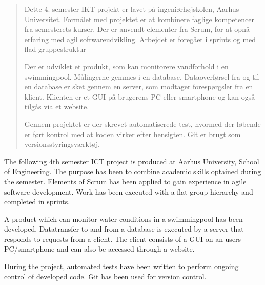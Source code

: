 \abstractintoc
\abstractcol
\setlength{\abstitleskip}{-18pt}


\begin{abstract}
Dette 4. semester IKT projekt er lavet på ingeniørhøjskolen, Aarhus Universitet. Formålet med projektet er at kombinere faglige kompetencer fra semesterets kurser. Der er anvendt elementer fra Scrum, for at opnå erfaring med agil softwareudvikling. Arbejdet er foregået i sprints og med flad gruppestruktur

Der er udviklet et produkt, som kan monitorere vandforhold i en swimmingpool. Målingerne gemmes i en database. Dataoverførsel fra og til en database er sket gennem en server, som modtager forespørgsler fra en klient. Klienten er et GUI på brugerens PC eller smartphone og kan også tilgås via et website.

Gennem projektet er der skrevet automatiserede test, hvormed der løbende er ført kontrol med at koden virker efter hensigten. Git er brugt som versionsstyringsværktøj. 
\end{abstract}

\begin{abstracten}
The following 4th semester ICT project is produced at Aarhus University, School of Engineering. The purpose has been to combine academic skills optained during the semester. Elements of Scrum has been applied to gain experience in agile software development. Work has been executed with a flat group hierarchy and completed in sprints.

A product which can monitor water conditions in a swimmingpool has been developed. Datatransfer to and from a database is executed by a server that responds to requests from a client. The client consists of a GUI on an users PC/smartphone and can also be accessed through a website.

During the project, automated tests have been written to perform ongoing control of developed code. Git has been used for version control. 
\end{abstracten}